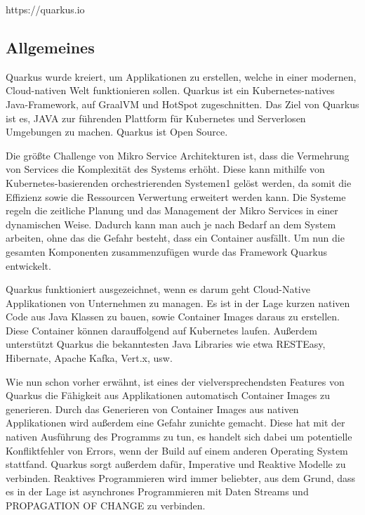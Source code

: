 https://quarkus.io 

\subsection{Allgemeines}
Quarkus wurde kreiert, um Applikationen zu erstellen, welche in einer modernen, Cloud-nativen Welt funktionieren sollen. Quarkus ist ein Kubernetes-natives Java-Framework, auf GraalVM und HotSpot zugeschnitten. Das Ziel von Quarkus ist es, JAVA zur führenden Plattform für Kubernetes und Serverlosen Umgebungen zu machen. Quarkus ist Open Source. 

Die größte Challenge von Mikro Service Architekturen ist, dass die Vermehrung von Services die Komplexität des Systems erhöht. Diese kann mithilfe von Kubernetes-basierenden orchestrierenden Systemen1 gelöst werden, da somit die Effizienz sowie die Ressourcen Verwertung erweitert werden kann. Die Systeme regeln die zeitliche Planung und das Management der Mikro Services in einer dynamischen Weise. Dadurch kann man auch je nach Bedarf an dem System arbeiten, ohne das die Gefahr besteht, dass ein Container ausfällt. Um nun die gesamten Komponenten zusammenzufügen wurde das Framework Quarkus entwickelt. 

Quarkus funktioniert ausgezeichnet, wenn es darum geht Cloud-Native Applikationen von Unternehmen zu managen. Es ist in der Lage kurzen nativen Code aus Java Klassen zu bauen, sowie Container Images daraus zu erstellen. Diese Container können darauffolgend auf Kubernetes laufen. Außerdem unterstützt Quarkus die bekanntesten Java Libraries wie etwa RESTEasy, Hibernate, Apache Kafka, Vert.x, usw. 

Wie nun schon vorher erwähnt, ist eines der vielversprechendsten Features von Quarkus die Fähigkeit aus Applikationen automatisch Container Images zu generieren. Durch das Generieren von Container Images aus nativen Applikationen wird außerdem eine Gefahr zunichte gemacht. Diese hat mit der nativen Ausführung des Programms zu tun, es handelt sich dabei um potentielle Konfliktfehler von Errors, wenn der Build auf einem anderen Operating System stattfand. 
Quarkus sorgt außerdem dafür, Imperative und Reaktive Modelle zu verbinden. Reaktives Programmieren wird immer beliebter, aus dem Grund, dass es in der Lage ist asynchrones Programmieren mit Daten Streams und PROPAGATION OF CHANGE zu verbinden.

